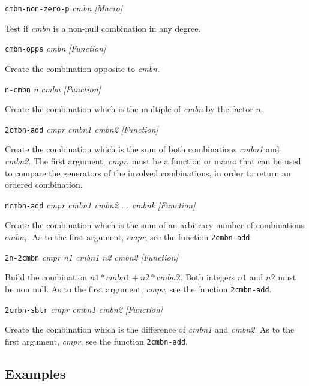 {{\leftskip=5mm
{\tt cmbn-non-zero-p} {\em cmbn} \hfill {\em [Macro]} \par}
{\leftskip=15mm
Test if {\em cmbn} is a non-null combination in any degree. \par}
{\leftskip=5mm
{\tt cmbn-opps} {\em cmbn} \hfill {\em [Function]} \par}
{\leftskip=15mm
Create the  combination opposite to {\em cmbn}. \par}
{\leftskip=5mm
{\tt n-cmbn} {\em n cmbn} \hfill {\em [Function]} \par}
{\leftskip=15mm
Create the  combination which is the multiple of  {\em cmbn} by the factor $n$. \par}
{\leftskip=5mm
{\tt 2cmbn-add} {\em cmpr cmbn1 cmbn2} \hfill {\em [Function]} \par}
{\leftskip=15mm
Create the combination which is the sum of both combinations {\em cmbn1} and {\em cmbn2}. The first
argument, {\em cmpr}, must be a function or macro that can be used to compare the generators of the
involved combinations, in order to return an ordered combination. \par}
}
\newpage
{\parindent=0mm
{\leftskip=5mm
{\tt ncmbn-add} {\em cmpr cmbn1 cmbn2 ... cmbnk} \hfill {\em [Function]} \par}
{\leftskip=15mm
Create the combination which is the sum of an arbitrary number of combinations $cmbn_i$. As to the first
argument, {\em cmpr}, see the function {\tt 2cmbn-add}. \par}
{\leftskip=5mm
{\tt 2n-2cmbn} {\em cmpr n1 cmbn1 n2 cmbn2} \hfill {\em [Function]} \par}
{\leftskip=15mm
Build the combination $n1 * cmbn1 + n2 * cmbn2$. Both integers $n1$ and $n2$ must be
non null. As to the first argument, {\em cmpr}, see the function {\tt 2cmbn-add}. \par}
{\leftskip=5mm
{\tt 2cmbn-sbtr} {\em cmpr cmbn1 cmbn2} \hfill {\em [Function]} \par}
{\leftskip=15mm
Create the combination which is the difference of {\em cmbn1} and {\em cmbn2}.
As to the first argument, {\em cmpr}, see the function {\tt 2cmbn-add}. \par}
}
\subsection* {Examples}


